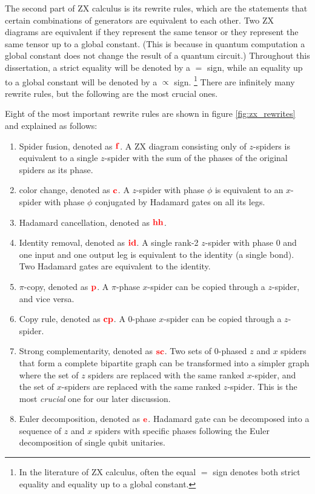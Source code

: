 The second part of ZX calculus is its rewrite rules,
which are the statements that certain combinations of generators are equivalent to each other.
Two ZX diagrams are equivalent if they represent the same tensor or they represent the same tensor up to a global constant. (This is because in quantum computation a global constant does not change the result of a quantum circuit.)
Throughout this dissertation, a strict equality will be denoted by a $=$ sign, while an equality up to a global constant will be denoted by a $\propto$ sign. \footnote{In the literature of ZX calculus, often the equal $=$ sign denotes both strict equality and equality up to a global constant.}
There are infinitely many rewrite rules, but the following are the most crucial ones.
\begin{definition}
	Eight of the most important rewrite rules are shown in figure \ref{fig:zx_rewrites} and explained as follows:
	\begin{enumerate}
	\item Spider fusion, denoted as $\color{red} \mathbf{f}$. 
		A ZX diagram consisting only of $z$-spiders is equivalent to a single $z$-spider with the sum of the phases of the original spiders as its phase.
	\item color change, denoted as $\color{red} \mathbf{c}$.
		A $z$-spider with phase $\phi$ is equivalent to an $x$-spider with phase $\phi$ conjugated by Hadamard gates on all its legs.
	\item Hadamard cancellation, denoted as $\color{red} \mathbf{hh}$.
	\item Identity removal, denoted as $\color{red} \mathbf{id}$.
		A single rank-2 $z$-spider with phase $0$ and one input and one output leg is equivalent to the identity (a single bond).
		Two Hadamard gates are equivalent to the identity.
	\item $\pi$-copy, denoted as $\color{red} \mathbf{p}$. A $\pi$-phase $x$-spider can be copied through a $z$-spider, and vice versa.
	\item Copy rule, denoted as $\color{red} \mathbf{cp}$. A $0$-phase $x$-spider can be copied through a $z$-spider.
	\item Strong complementarity, denoted as $\color{red} \mathbf{sc}$. 
		Two sets of 0-phased $z$ and $x$ spiders that form a complete bipartite graph can be transformed into a simpler graph where the set of $z$ spiders are replaced with the same ranked $x$-spider, and the set of $x$-spiders are replaced with the same ranked $z$-spider.
		This is the most \emph{crucial} one for our later discussion. 
	\item Euler decomposition, denoted as $\color{red} \mathbf{e}$. 
		Hadamard gate can be decomposed into a sequence of $z$ and $x$ spiders with specific phases following the Euler decomposition of single qubit unitaries.
\end{enumerate}


\end{definition}
